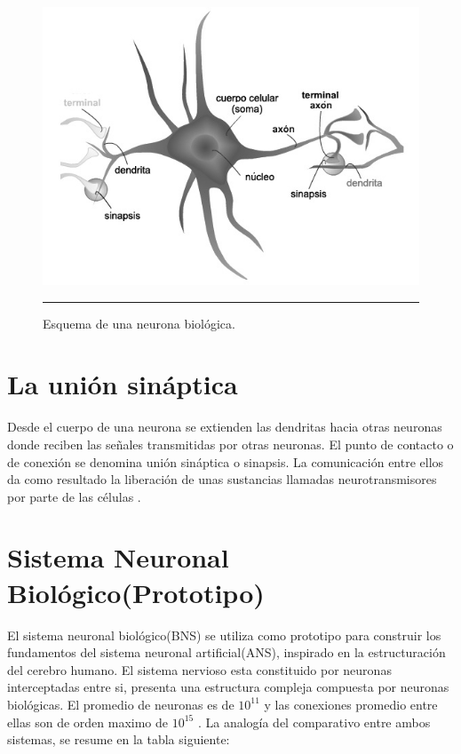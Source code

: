 \documentclass[11pt,titlepage]{report}
\begin{document}
\begin{figure}[h] 
	\centering	
	\includegraphics[scale=0.8]{Pic/neuronabiologica03}
	\caption{Esquema de una neurona biológica. \cite{Int10} }
	\hrule
\end{figure} 

\section{La unión sináptica}
Desde el cuerpo de una neurona se extienden las dendritas hacia otras neuronas donde reciben las señales transmitidas por otras neuronas. El punto de contacto o de conexión se denomina unión sináptica o sinapsis. La comunicación entre ellos da como resultado la liberación de unas sustancias llamadas neurotransmisores por parte de las células \cite{Lib06}.

\section{Sistema Neuronal Biológico(Prototipo)}
El sistema neuronal biológico(BNS) se utiliza como prototipo para construir los fundamentos del sistema neuronal artificial(ANS), inspirado en la estructuración del cerebro humano. El sistema nervioso esta constituido por neuronas interceptadas entre si, presenta una estructura compleja compuesta por neuronas biológicas. El promedio de neuronas es de $10^{11}$ y las conexiones promedio entre ellas son de orden maximo de $10^{15}$ \cite{Art14}. La analogía del comparativo entre ambos sistemas, se resume en la tabla siguiente: 
\end{document}
